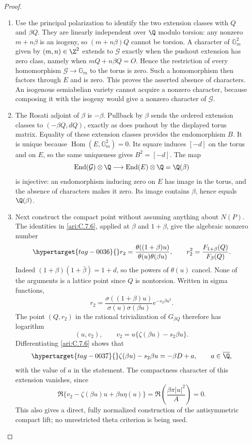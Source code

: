 \begin{proof}
\begin{enumerate}[label=\arabic*.,leftmargin=*]
\item Use the principal polarization to identify the two extension
classes with $Q$ and $\beta Q$. They are linearly independent
over $\Q$ modulo torsion: any nonzero $m+n\beta$ is an
isogeny, so $(m+n\beta)Q$ cannot be torsion. A character
of $\mathbb G_m^2$ given by $(m,n)\in\Z^2$ extends to
$\mathcal G$ exactly when the pushout extension has zero
class, namely when $mQ+n\beta Q=O$. Hence the restriction
of every homomorphism $\mathcal G\to\mathbb G_m$ to
the torus is zero. Such a homomorphism then factors through
$E$ and is zero. This proves the asserted absence of
characters. An isogenous semiabelian variety cannot acquire
a nonzero character, because composing it with the isogeny
would give a nonzero character of $\mathcal G$.

\item The Rosati adjoint of $\beta$ is $-\beta$. Pullback by
$\beta$ sends the ordered extension classes to
$(-\beta Q,dQ)$, exactly as does pushout by the displayed
torus matrix. Equality of these extension classes provides
the endomorphism $B$. It is unique because
$\operatorname{Hom}(E,\mathbb G_m^2)=0$. Its square
induces $[-d]$ on the torus and on $E$, so the same
uniqueness gives $B^2=[-d]$. The map
\[
 \operatorname{End}(\mathcal G)\otimes\Q
     \longrightarrow\operatorname{End}(E)\otimes\Q
          =\Q(\beta)
\]
is injective: an endomorphism inducing zero on $E$ has image
in the torus, and the absence of characters makes it zero.
Its image contains $\beta$, hence equals $\Q(\beta)$.

\item Next construct the compact point without assuming anything
about $N(P)$. The identities in \ref{ari:C.7.6}, applied at $\beta$
and $1+\beta$, give the algebraic nonzero number
\begin{equation}\hypertarget{tag-0036}{}\label{ari:eq:ce-ribet-r}
 r_2=\frac{\theta((1+\beta)u)}{\theta(u)\theta(\beta u)},
 \qquad r_2^2=\frac{F_{1+\beta}(Q)}{F_\beta(Q)}.
\end{equation}
Indeed $(1+\beta)(1+\bar\beta)=1+d$, so the powers
of $\theta(u)$ cancel. None of the arguments is a lattice
point since $Q$ is nontorsion. Written in sigma functions,
\[
 r_2=\frac{\sigma((1+\beta)u)}{\sigma(u)\sigma(\beta u)}
                         e^{-s_2\beta u^2}.
\]
The point $(Q,r_2)$ in the rational trivialization of
$G_{\beta Q}$ therefore has logarithm
\[
 (u,v_2),\qquad
 v_2=u\{\zeta(\beta u)-s_2\beta u\}.
\]
Differentiating \ref{ari:C.7.6} shows that
\begin{equation}\hypertarget{tag-0037}{}\label{ari:eq:ce-zeta}
 \zeta(\beta u)-s_2\beta u=-\beta D+a,
 \qquad a\in\overline\Q,
\end{equation}
with the value of $a$ in the statement. The compactness
character of this extension vanishes, since
\[
 \Re\{v_2-\zeta(\beta u)u+\beta u\eta(u)\}
    =\Re\left(\frac{\beta\pi|u|^2}{A}\right)=0.
\]
This also gives a direct, fully normalized construction of
the antisymmetric compact lift; no unrestricted theta
criterion is being used.


\end{enumerate}
\end{proof}
